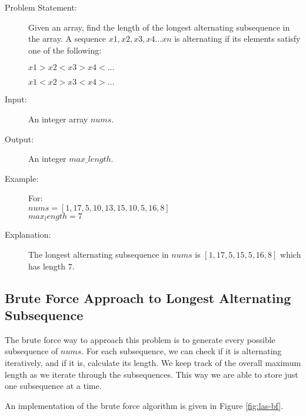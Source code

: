 \begin{description}
    \item[Problem Statement:]
        Given an array, find the length of the longest alternating subsequence in the array.
        A sequence ${x1,x2,x3,x4...xn}$ is alternating if its elements satisfy one of the following:

        $x1>x2<x3>x4<...$
        
        $x1<x2>x3<x4>...$
        
    \item[Input:]
        An integer array $nums$.
        
    \item[Output:] 
        An integer $max\_length$.
        
    \item[Example:] For:\\
        $nums = [1,17,5,10,13,15,10,5,16,8]$\\
        $max_length = 7$

    \item[Explanation:]
        The longest alternating subsequence in $nums$ is $[1,17,5,15,5,16,8]$ which has length $7$.

\end{description}

    

\subsection{Brute Force Approach to Longest Alternating Subsequence}

The brute force way to approach this problem is to generate every possible subsequence of $nums$. 
For each subsequence, we can check if it is alternating iteratively, and if it is, calculate its length.
We keep track of the overall maximum length as we iterate through the subsequences. This way we are able to store just one subsequence at a time.

An implementation of the brute force algorithm is given in Figure \ref{fig:las-bf}.


